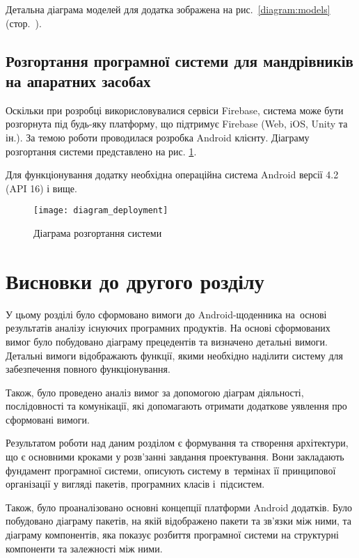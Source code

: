 \documentclass[../main.tex]{subfiles}
\begin{document}
Детальна діаграма моделей для додатка зображена на рис.~\ref{diagram:models} (стор.~\pageref{diagram:models}).


\subsection{Розгортання програмної системи для мандрівників на апаратних засобах} %
Оскільки при розробці викорисловувалися сервіси Firebase, система може бути розгорнута під будь-яку платформу, що підтримує Firebase (Web, iOS, Unity та ін.). За темою роботи проводилася розробка Android клієнту. Діаграму розгортання системи представлено на рис. \ref{diagram:deployment}.

Для функціонування додатку необхідна операційна система Android версії 4.2 (API 16) і вище.

\begin{figure}[H]
	\centering
	\texttt{[image: diagram\_deployment]}
	\caption{Діаграма розгортання системи}
	\label{diagram:deployment}
\end{figure}

\section{Висновки до другого розділу}

У цьому розділі було сформовано вимоги до Android-щоденника на~основі результатів аналізу існуючих програмних продуктів. На основі сформованих вимог було побудовано діаграму прецедентів та визначено  детальні вимоги. Детальні вимоги відображають функції, якими необхідно наділити систему для забезпечення повного функціонування.

Також, було проведено аналіз вимог за допомогою діаграм діяльності, послідовності та комунікації, які допомагають отримати додаткове уявлення про сформовані вимоги.

Результатом роботи над даним розділом є формування та створення архітектури, що є основними кроками у розв'занні завдання проектування. Вони закладають фундамент програмної системи, описують систему в~термінах її принципової організації у вигляді пакетів, програмних класів і~підсистем.

\newpage
Також, було проаналізовано основні концепції платформи Android додатків. Було побудовано діаграму пакетів, на якій відображено пакети та зв'язки між ними, та діаграму компонентів, яка показує розбиття програмної системи на структурні компоненти та залежності між ними.
\end{document}
